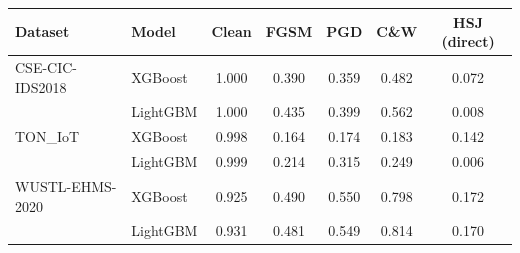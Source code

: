 \begin{tabular}{l l c c c c c}
\toprule
\textbf{Dataset} & \textbf{Model} & \textbf{Clean} & \textbf{FGSM} & \textbf{PGD} & \textbf{C\&W} & \textbf{HSJ (direct)} \\
\midrule
CSE-CIC-IDS2018 & XGBoost & 1.000 & 0.390 & 0.359 & 0.482 & 0.072 \\
 & LightGBM & 1.000 & 0.435 & 0.399 & 0.562 & 0.008 \\
TON\_IoT & XGBoost & 0.998 & 0.164 & 0.174 & 0.183 & 0.142 \\
 & LightGBM & 0.999 & 0.214 & 0.315 & 0.249 & 0.006 \\
WUSTL-EHMS-2020 & XGBoost & 0.925 & 0.490 & 0.550 & 0.798 & 0.172 \\
 & LightGBM & 0.931 & 0.481 & 0.549 & 0.814 & 0.170 \\
\bottomrule
\end{tabular}
